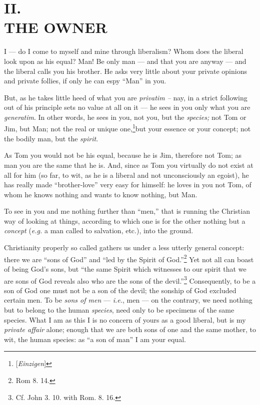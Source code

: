 
\chapter[II. The Owner]{\centering II.\\
THE OWNER}

I --- do I come to myself and mine through liberalism? Whom does the liberal 
look upon as his equal? Man! Be only man --- and that you are anyway --- and the 
liberal calls you his brother. He asks very little about your private opinions 
and private follies, if only he can espy ``Man'' in you.

But, as he takes little heed of what you are \textit{privatim --} nay, in a 
strict following out of his principle sets no value at all on it --- he sees in 
you only what you are \textit{generatim}. In other words, he sees in you, not 
you, but the \textit{species;} not Tom or Jim, but Man; not the real or unique 
one,\footnote{[\textit{Einzigen}] }but your essence or your concept; not the 
bodily man, but the \textit{spirit}.

As Tom you would not be his equal, because he is Jim, therefore not Tom; as 
man you are the same that he is. And, since as Tom you virtually do not exist 
at all for him (so far, to wit, as he is a liberal and not unconsciously an 
egoist), he has really made ``brother-love'' very easy for himself: he loves 
in you not Tom, of whom he knows nothing and wants to know nothing, but Man.

To see in you and me nothing further than ``men,'' that is running the 
Christian way of looking at things, according to which one is for the other 
nothing but a \textit{concept} (\textit{e.g.} a man called to salvation, 
etc.), into the ground.

Christianity properly so called gathers us under a less utterly general 
concept: there we are ``sons of God'' and ``led by the Spirit of 
God.''\footnote{Rom 8. 14.} Yet not all can boast of being God's sons, but 
``the same Spirit which witnesses to our spirit that we are sons of God 
reveals also who are the sons of the devil.''\footnote{Cf. John 3. 10. with 
Rom. 8. 16.} Consequently, to be a son of God one must not be a son of the 
devil; the sonship of God excluded certain men. To be \textit{sons of men} --- \textit{i.e.}, men --- on the contrary, we need nothing but to belong to the 
human \textit{species}, need only to be specimens of the same species. What I 
am as this I is no concern of yours as a good liberal, but is my 
\textit{private affair} alone; enough that we are both sons of one and the 
same mother, to wit, the human species: as ``a son of man'' I am your equal.

